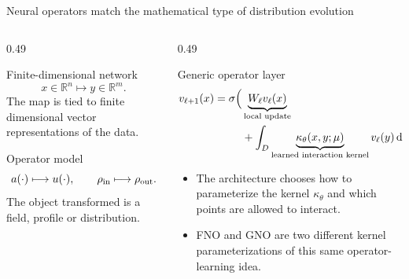 \begin{frame}[t,shrink=5]{Neural operators match the mathematical type of distribution evolution}
\begin{columns}[T,onlytextwidth]
\begin{column}{0.49\textwidth}
\begin{block}{Finite-dimensional network}
\[x\in\mathbb R^n\longmapsto y\in\mathbb R^m.\]The map is tied to finite dimensional vector representations of the data.
\end{block}
\begin{block}{Operator model}
\[a(\cdot)\longmapsto u(\cdot),\qquad\rho_{\rm in}\longmapsto\rho_{\rm out}.\]The object transformed is a field, profile or distribution.
\end{block}

\end{column}
\begin{column}{0.49\textwidth}
\begin{block}{Generic operator layer}
\[\begin{aligned}v_{\ell+1}(x)=\sigma\Bigl(&\underbrace{W_\ell v_\ell(x)}_{\text{local update}}\\&+\int_D\underbrace{\kappa_\theta(x,y;\mu)}_{\text{learned interaction kernel}}v_\ell(y)\,\mathrm d\nu(y)\Bigr).\end{aligned}\]
\end{block}
\begin{itemize}
\item The architecture chooses how to parameterize the kernel $\kappa_\theta$ and which points are allowed to interact.
\item FNO and GNO are two different kernel parameterizations of this same operator-learning idea.
\end{itemize}
\end{column}
\end{columns}


\end{frame}


